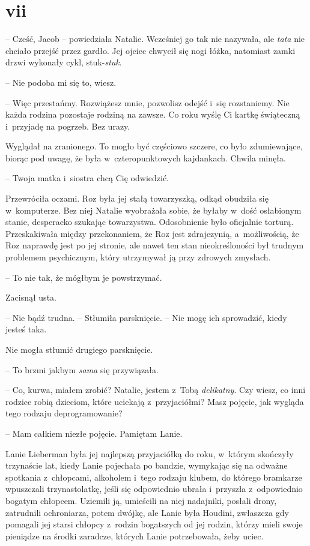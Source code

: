 \documentclass[oneside,polish,11pt,sfheadings]{mwbk}
\begin{document}
\chapter*{vii}

-- Cześć, Jacob -- powiedziała Natalie. Wcześniej go tak nie nazywała, ale
\textit{tata} nie chciało przejść przez gardło. Jej ojciec chwycił się
nogi łóżka, natomiast zamki drzwi wykonały cykl, stuk-\textit{stuk}.

-- Nie podoba mi się to, wiesz.

-- Więc przestańmy. Rozwiążesz mnie, pozwolisz odejść i~się rozstaniemy.
Nie każda rodzina pozostaje rodziną na zawsze. Co roku wyślę Ci kartkę
świąteczną i~przyjadę na pogrzeb. Bez urazy.

Wyglądał na zranionego. To mogło być częściowo szczere, co było
zdumiewające, biorąc pod uwagę, że była w~czteropunktowych kajdankach.
Chwila minęła.

-- Twoja matka i~siostra chcą Cię odwiedzić.

Przewróciła oczami. Roz była jej stałą towarzyszką, odkąd obudziła się w~komputerze. Bez niej Natalie wyobrażała sobie, że byłaby w~dość
osłabionym stanie, desperacko szukając towarzystwa. Odosobnienie było
oficjalnie torturą. Przeskakiwała między przekonaniem, że Roz jest
zdrajczynią, a~możliwością, że Roz naprawdę jest po jej stronie, ale
nawet ten stan nieokreśloności był trudnym problemem psychicznym, który
utrzymywał ją przy zdrowych zmysłach.

-- To nie tak, że mógłbym je powstrzymać.

Zacisnął usta. 

-- Nie bądź trudna. -- Stłumiła parsknięcie. -- Nie mogę ich
sprowadzić, kiedy jesteś taka.

Nie mogła stłumić drugiego parsknięcie. 

-- To brzmi jakbym \textit{sama}
się przywiązała.

-- Co, kurwa, miałem zrobić? Natalie, jestem z~Tobą \textit{delikatny}. Czy
wiesz, co inni rodzice robią dzieciom, które uciekają z~przyjaciółmi?
Masz pojęcie, jak wygląda tego rodzaju deprogramowanie?

-- Mam całkiem niezłe pojęcie. Pamiętam Lanie.

Lanie Lieberman była jej najlepszą przyjaciółką do roku, w~którym
skończyły trzynaście lat, kiedy Lanie pojechała po bandzie, wymykając
się na odważne spotkania z~chłopcami, alkoholem i~tego rodzaju klubem,
do którego bramkarze wpuszczali trzynastolatkę, jeśli się odpowiednio
ubrała i~przyszła z~odpowiednio bogatym chłopcem. Uziemili ją, umieścili
na niej nadajniki, posłali drony, zatrudnili ochroniarza, potem dwójkę,
ale Lanie była Houdini, zwłaszcza gdy pomagali jej starsi chłopcy z~rodzin bogatszych od jej rodzin, którzy mieli swoje pieniądze na środki
zaradcze, których Lanie potrzebowała, żeby uciec.
\end{document}
